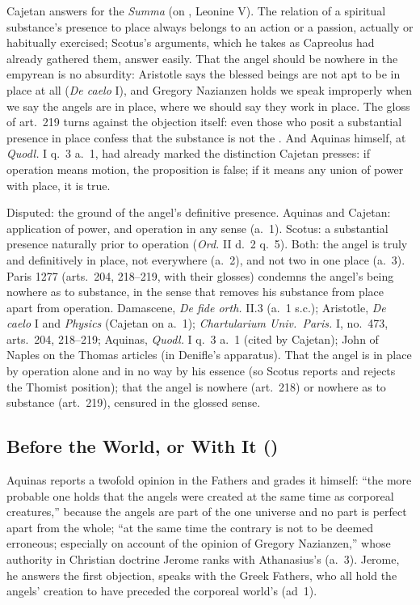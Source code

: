 Cajetan answers for the \emph{Summa} (on , Leonine V).
The relation of a spiritual substance's presence to place always belongs
to an action or a passion, actually or habitually exercised; Scotus's
arguments, which he takes as Capreolus had already gathered them, answer
easily. That the angel should be nowhere in the empyrean is no
absurdity: Aristotle says the blessed beings are not apt to be in place
at all (\emph{De caelo} I), and Gregory Nazianzen holds we speak
improperly when we say the angels are in place, where we should say they
work in place. The gloss of art.~219 turns against the objection itself:
even those who posit a substantial presence in place confess that the
substance is not the . And
Aquinas himself, at \emph{Quodl.} I q.~3 a.~1, had already marked the
distinction Cajetan presses: if operation means motion, the proposition
is false; if it means any union of power with place, it is true.

 {Disputed: the ground of the angel's definitive presence. Aquinas and
  Cajetan: application of power, and operation in any sense (a.~1).
  Scotus: a substantial presence naturally prior to operation (\emph{Ord.}
  II d.~2 q.~5). Both: the angel is truly and definitively in place, not
  everywhere (a.~2), and not two in one place (a.~3). Paris 1277
  (arts.~204, 218--219, with their glosses) condemns the angel's being
  nowhere as to substance, in the sense that removes his substance from
  place apart from operation.}
 {Damascene, \emph{De fide orth.} II.3 (a.~1 s.c.); Aristotle,
  \emph{De caelo} I and \emph{Physics} (Cajetan on a.~1);
  \emph{Chartularium Univ.\ Paris.} I, no.~473, arts.~204, 218--219;
  Aquinas, \emph{Quodl.} I q.~3 a.~1 (cited by Cajetan); John of Naples
  on the Thomas articles (in Denifle's apparatus).}
 {That the angel is in place by operation alone and in no way by his
  essence (so Scotus reports and rejects the Thomist position); that the
  angel is nowhere (art.~218) or nowhere as to substance (art.~219),
  censured in the glossed sense.}

\subsection{Before the World, or With It ()}\label{sec:dq-time}

Aquinas reports a twofold opinion in the Fathers and grades it himself:
``the more probable one holds that the angels were created at the same
time as corporeal creatures,'' because the angels are part of the one
universe and no part is perfect apart from the whole; ``at the same time
the contrary is not to be deemed erroneous; especially on account of the
opinion of Gregory Nazianzen,'' whose authority in Christian doctrine
Jerome ranks with Athanasius's (a.~3). Jerome, he answers the first
objection, speaks with the Greek Fathers, who all hold the angels'
creation to have preceded the corporeal world's (ad~1).

